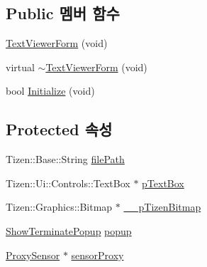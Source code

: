 \subsection*{Public 멤버 함수}
\begin{DoxyCompactItemize}
\item 
\hyperlink{class_text_viewer_form_ada62cff12c9cfa681225802c67533d9d}{Text\+Viewer\+Form} (void)
\item 
virtual \hyperlink{class_text_viewer_form_a99d3e7fdee7c11c98b553d37bccbd561}{$\sim$\+Text\+Viewer\+Form} (void)
\item 
bool \hyperlink{class_text_viewer_form_a4ad26f2e53b8f74ce5d3faefc551b2e6}{Initialize} (void)
\end{DoxyCompactItemize}
\subsection*{Protected 속성}
\begin{DoxyCompactItemize}
\item 
Tizen\+::\+Base\+::\+String \hyperlink{class_text_viewer_form_a5cea61f0286c8cda983e61760e9d5f47}{file\+Path}
\item 
Tizen\+::\+Ui\+::\+Controls\+::\+Text\+Box $\ast$ \hyperlink{class_text_viewer_form_af19e24e33e90149750d852ce35da7b38}{p\+Text\+Box}
\item 
Tizen\+::\+Graphics\+::\+Bitmap $\ast$ \hyperlink{class_text_viewer_form_ab424cff2021ff464552b4185579209f1}{\+\_\+\+\_\+p\+Tizen\+Bitmap}
\item 
\hyperlink{class_show_terminate_popup}{Show\+Terminate\+Popup} \hyperlink{class_text_viewer_form_afd589dc0e964f2615dfc9414ffffdb44}{popup}
\item 
\hyperlink{class_proxy_sensor}{Proxy\+Sensor} $\ast$ \hyperlink{class_text_viewer_form_a5235dd45fbd19e2a6c64949ee9803829}{sensor\+Proxy}
\end{DoxyCompactItemize}

